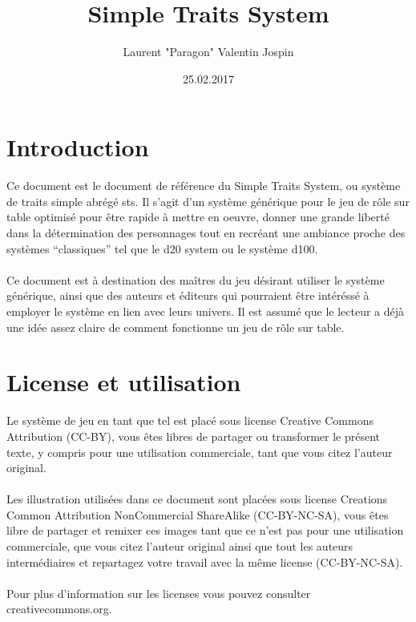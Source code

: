 \documentclass[a4paper,10pt,twoside,twocolumn]{article}
\author{Laurent "Paragon" Valentin Jospin}
\title{Simple Traits System}
\date{25.02.2017}
\begin{document}
  \maketitle
 
 \section{Introduction}
 
 Ce document est le document de référence du Simple Traits System, ou système de traits simple abrégé sts. Il s'agit d'un système générique pour le jeu de rôle sur table optimisé pour être rapide à mettre en oeuvre, donner une grande liberté dans la détermination des personnages tout en recréant une ambiance proche des systèmes ``classiques'' tel que le d20 system ou le système d100.\\
 \\
 Ce document est à destination des maîtres du jeu désirant utiliser le système générique, ainsi que des auteurs et éditeurs qui pourraient être intéréssé à employer le système en lien avec leurs univers. Il est assumé que le lecteur a déjà une idée assez claire de comment fonctionne un jeu de rôle sur table.
 
 \section{License et utilisation}
 
 Le système de jeu en tant que tel est placé sous license Creative Commons Attribution (CC-BY), vous êtes libres de partager ou transformer le présent texte, y compris pour une utilisation commerciale, tant que vous citez l'auteur original.\\
 \\
 Les illustration utilisées dans ce document sont placées sous license Creations Common Attribution NonCommercial ShareAlike (CC-BY-NC-SA), vous êtes libre de partager et remixer ces images tant que ce n'est pas pour une utilisation commerciale, que vous citez l'auteur original ainsi que tout les auteurs intermédiaires et repartagez votre travail avec la même license (CC-BY-NC-SA).\\
 \\
 Pour plus d'information sur les licenses vous pouvez consulter creativecommons.org.
 
\end{document}
